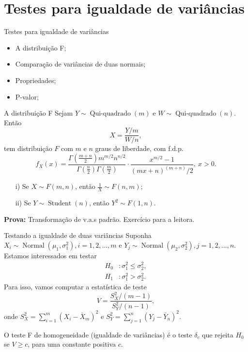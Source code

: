 \section{Testes para igualdade de variâncias}
\begin{frame}{Testes para igualdade de variâncias}
 \begin{itemize}
   \item A distribuição F;
   \item Comparação de variâncias de duas normais;
   \item Propriedades; 
   \item P-valor;
   \end{itemize}
\end{frame}


 \begin{frame}{A distribuição F}
  Sejam $Y \sim\operatorname{Qui-quadrado}(m)$ e $W \sim\operatorname{Qui-quadrado}(n)$.
  Então 
  \begin{equation*}
   X = \frac{Y/m}{W/n},
  \end{equation*}
tem distribuição $F$ com $m$ e $n$ graus de liberdade, com f.d.p.
\begin{equation*}
 f_X(x) = \frac{\Gamma\left(\frac{m + n}{2}\right)m^{m/2} n^{n/2}}{\Gamma\left(\frac{n}{2}\right)\Gamma\left(\frac{m}{2}\right)} \cdot \frac{x^{m/2}-1}{(mx + n)^(m + n)/2}, \: x > 0.
\end{equation*}
\begin{theo}
 \begin{itemize}
  \item[i)] Se $X \sim F(m, n)$, então $\frac{1}{X} \sim F(n, m)$;
  \item[ii)] Se $Y \sim\operatorname{Student}(n)$, então $Y^2 \sim F(1, n)$.
 \end{itemize}
\end{theo}
\textbf{Prova:} Transformação de v.a.s padrão.
Exercício para a leitora.
 \end{frame}

 \begin{frame}{Testando a igualdade de duas variâncias}
  Suponha $X_i \sim\operatorname{Normal}(\mu_1, \sigma_1^2), i = 1, 2, \ldots, m$ e $Y_j \sim\operatorname{Normal}(\mu_2, \sigma_2^2), j = 1, 2, \ldots, n$.
  Estamos interessados em testar
  \begin{align*}
   H_0 &: \sigma_1^2 \leq \sigma_2^2 , \\
   H_1&:  \sigma_1^2 > \sigma_2^2. 
  \end{align*}
 Para isso, vamos computar a estatística de teste 
 \begin{equation*}
  V = \frac{S_X^2/(m-1)}{S_Y^2/(n-1)},
 \end{equation*}
 onde $S_X^2 = \sum_{i=1}^m (X_i-\bar{X}_m)^2$ e $S_Y^2 = \sum_{j=1}^n (Y_j-\bar{Y}_n)^2$.
 
 \begin{defn}[O teste F]
 \label{def:F_test}
  O teste F de homogeneidade (igualdade de variâncias)  é o teste $\delta_c$ que rejeita $H_0$ se $V \geq c$, para uma constante positiva $c$.
 \end{defn}

 \end{frame}

